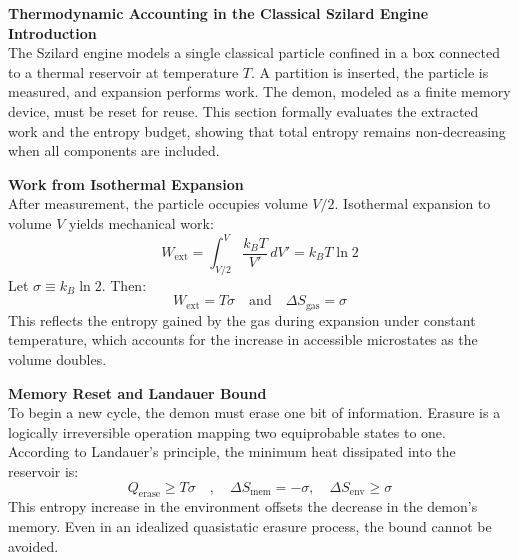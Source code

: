 \begin{technical}
{\Large\textbf{Thermodynamic Accounting in the Classical Szilard Engine}}\\[0.7em]

\noindent\textbf{Introduction}\\[0.5em]
The Szilard engine models a single classical particle confined in a box connected to a thermal reservoir at temperature \( T \). A partition is inserted, the particle is measured, and expansion performs work. The demon, modeled as a finite memory device, must be reset for reuse. This section formally evaluates the extracted work and the entropy budget, showing that total entropy remains non-decreasing when all components are included.

\vspace{0.5em}
\noindent\textbf{Work from Isothermal Expansion}\\[0.5em]
After measurement, the particle occupies volume \( V/2 \). Isothermal expansion to volume \( V \) yields mechanical work:
\[
W_{\text{ext}} = \int_{V/2}^{V} \frac{k_B T}{V'}\,dV' = k_B T \ln 2
\]
Let \( \sigma \equiv k_B \ln 2 \). Then:
\[
W_{\text{ext}} = T \sigma
\quad \text{and} \quad
\Delta S_{\text{gas}} = \sigma
\]
This reflects the entropy gained by the gas during expansion under constant temperature, which accounts for the increase in accessible microstates as the volume doubles.

\vspace{0.5em}
\noindent\textbf{Memory Reset and Landauer Bound}\\[0.5em]
To begin a new cycle, the demon must erase one bit of information. Erasure is a logically irreversible operation mapping two equiprobable states to one. According to Landauer's principle, the minimum heat dissipated into the reservoir is:
\[
Q_{\text{erase}} \geq T \sigma
\quad, \quad
\Delta S_{\text{mem}} = -\sigma, \quad
\Delta S_{\text{env}} \geq \sigma
\]
This entropy increase in the environment offsets the decrease in the demon’s memory. Even in an idealized quasistatic erasure process, the bound cannot be avoided.


\end{technical}
